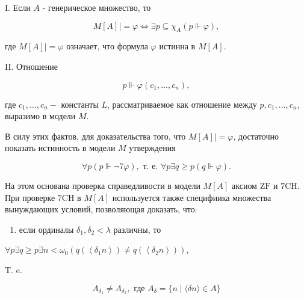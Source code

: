 \documentclass[10pt]{article}
\begin{document}
I. Если $A$ - генерическое множество, то



\[

M[A] \mid=\varphi \Longleftrightarrow \exists p \subseteq \chi_{A}(p \Vdash \varphi),

\]



где $M[A] \mid=\varphi$ означает, что формула $\varphi$ истинна в $M[A]$.



II. Отношение



\[

p \Vdash \varphi\left(c_{1}, \ldots, c_{n}\right),

\]



где $c_{1}, \ldots, c_{n}-$ константы $L$, рассматриваемое как отношение между $p, c_{1}, \ldots, c_{n}$, выразимо в модели $M$.



В силу этих фактов, для доказательства того, что $M[A] \mid=\varphi$, достаточно показать истинность в модели $M$ утверждения



\[

\forall p(p \Vdash \neg 7 \varphi), \text { т. е. } \forall p \exists q \geqslant p(q \Vdash \varphi) .

\]



На этом основана проверка справедливости в модели $M[A]$ аксиом $\mathrm{ZF}$ и $7 \mathrm{CH}$. При проверке $7 \mathrm{CH}$ в $M[A]$ используется также специфиика множества вынуждающих условий, позволяющая доказать, что:



\begin{enumerate}

  \item если ординалы $\delta_{1}, \delta_{2}<\lambda$ различны, то

\end{enumerate}



$\forall p \exists q \geqslant p \exists n<\omega_{0}\left(q\left(\left\langle\delta_{1} n\right\rangle\right) \neq q\left(\left\langle\delta_{2} n\right\rangle\right)\right)$,



T. e.



\[

A_{\delta_{1}} \neq A_{\delta_{2}}, \text { где } A_{\delta}=\{n \mid\langle\delta n\rangle \in A\}

\]
\end{document}
